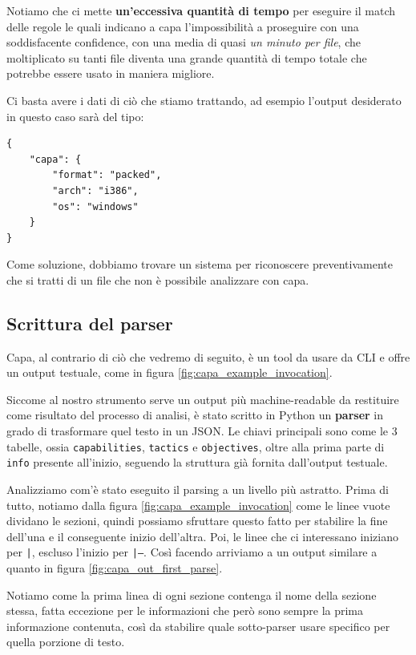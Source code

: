 Notiamo che ci mette \textbf{un'eccessiva quantità di tempo} per
eseguire il match delle regole le quali indicano a capa l'impossibilità a proseguire con una soddisfacente confidence, con una media di quasi \emph{un minuto per file}, che moltiplicato su tanti file diventa una grande quantità di tempo totale che potrebbe essere usato in maniera migliore.

\medskip

Ci basta avere i dati di ciò che stiamo trattando, ad esempio l'output desiderato in questo caso sarà del tipo:
\begin{verbatim}
{
    "capa": {
        "format": "packed",
        "arch": "i386",
        "os": "windows"
    }
}
\end{verbatim}

Come soluzione, dobbiamo trovare un sistema per riconoscere preventivamente che si tratti di un file che non è possibile analizzare con capa.

\subsection{Scrittura del parser}
Capa, al contrario di ciò che vedremo di seguito, è un tool da usare da CLI e offre un output testuale, come in figura \ref{fig:capa_example_invocation}.

Siccome al nostro strumento serve un output più machine-readable da restituire come risultato del processo di analisi, è stato scritto in Python un \textbf{parser} in grado di trasformare quel testo in un JSON.
Le chiavi principali sono come le 3 tabelle, ossia \texttt{capabilities}, \texttt{tactics} e \texttt{objectives}, oltre alla prima parte di \texttt{info} presente all'inizio, seguendo la struttura già fornita dall'output testuale.

Analizziamo com'è stato eseguito il parsing a un livello più astratto.
Prima di tutto, notiamo dalla figura \ref{fig:capa_example_invocation} come le linee vuote dividano le sezioni, quindi possiamo sfruttare questo fatto per stabilire la fine dell'una e il conseguente inizio dell'altra.
Poi, le linee che ci interessano iniziano per \texttt{|}, escluso l'inizio per \texttt{|---}. Così facendo arriviamo a un output similare a quanto in figura \ref{fig:capa_out_first_parse}.

Notiamo come la prima linea di ogni sezione contenga il nome della sezione stessa, fatta eccezione per le informazioni che però sono sempre la prima informazione contenuta, così da stabilire quale sotto-parser usare specifico per quella porzione di testo.

